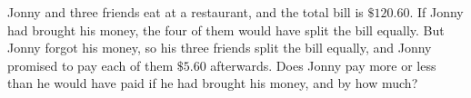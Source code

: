 Jonny and three friends eat at a restaurant, and the total bill is $\$120.60$. If Jonny had brought his money, the four of them would have split the bill equally. But Jonny forgot his money, so his three friends split the bill equally, and Jonny promised to pay each of them $\$5.60$ afterwards. Does Jonny pay more or less than he would have paid if he had brought his money, and by how much?
